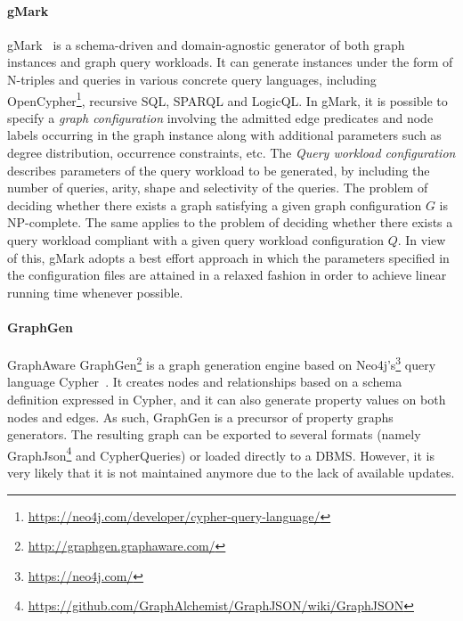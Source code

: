 \paragraph{gMark}  gMark~\cite{gMark} is a schema-driven and domain-agnostic generator of both graph instances and graph query workloads. It can generate instances under the form of N-triples and queries in various concrete query languages, including OpenCypher\footnote{\url{https://neo4j.com/developer/cypher-query-language/}}, recursive SQL, SPARQL and LogicQL. In gMark, it is possible to specify a \emph{graph configuration} involving the admitted edge predicates and node labels occurring in the graph instance along with additional parameters such as degree distribution, occurrence constraints, etc. The \emph{Query workload configuration} describes parameters of the query workload to be generated, by including the number of queries, arity, shape and selectivity of the queries.
The problem of deciding whether there exists a graph satisfying a given graph configuration $G$ is NP-complete. The same applies to the problem of deciding
whether there exists a query workload compliant with a given query workload configuration $Q$. In view of this, gMark adopts a best effort approach in which the
parameters specified in the configuration files are attained in a relaxed fashion in order to achieve linear running time whenever possible.


\paragraph{GraphGen}  GraphAware GraphGen\footnote{\url{http://graphgen.graphaware.com/}} is a graph generation engine based on Neo4j's\footnote{\url{https://neo4j.com/}} query language Cypher~\cite{GraphGen}.  It creates nodes and relationships based on a schema definition expressed in Cypher, and it can also generate property values on both
nodes and edges. As such, GraphGen is a precursor of property graphs generators. The resulting graph can be exported to several formats (namely GraphJson\footnote{\url{https://github.com/GraphAlchemist/GraphJSON/wiki/GraphJSON}} and CypherQueries) or loaded directly to a DBMS. However, it is very likely that it is not maintained anymore due to the lack of available updates.
